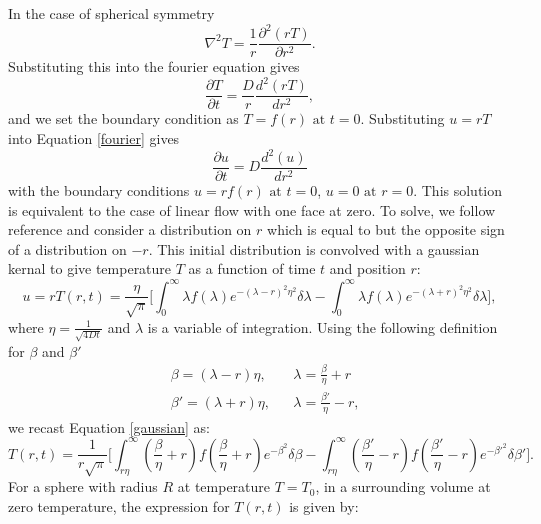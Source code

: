 

In the case of spherical symmetry
\begin{equation}
\nabla^2T = \frac{1}{r}\frac{\partial^2(rT)}{\partial r^2}.
\end{equation}
Substituting this into the fourier equation gives
\begin{equation} \label{fourier}
\frac{\partial T}{\partial t} = \frac{D}{r}\frac{d^2(rT)}{d r^2},
\end{equation} 
and we set the boundary condition as  $T = f(r) \text{ at } t=0$.
Substituting $u = rT$ into Equation \ref{fourier} gives
\begin{equation}
\frac{\partial u}{\partial t} = D\frac{d^2(u)}{dr^2}
\end{equation}
with the boundary conditions $u = rf(r) \text{ at } t=0$, $u = 0 \text{ at } r=0$.
This solution is equivalent to the case of linear flow with one face at zero. To solve, we follow reference \cite{Ingersoll1948} and consider a distribution on $r$ which is equal to but the opposite sign of a distribution on $-r$. This initial distribution is convolved with a gaussian kernal to give temperature $T$ as a function of time $t$ and position $r$: 
\begin{equation} \label{gaussian}
u = rT(r,t) = \frac{\eta}{\sqrt{\pi}} \bigg[ \int_0^\infty \lambda f(\lambda) e^{-(\lambda-r)^2\eta^2}\delta \lambda - \int_0^\infty \lambda f(\lambda) e^{-(\lambda+r)^2\eta^2}\delta \lambda \bigg],
\end{equation}
where $\eta = \frac{1}{\sqrt{4Dt}}$ and $\lambda$ is a variable of integration.
Using the following definition for $\beta$ and $\beta'$
\begin{equation}
\begin{aligned}
& \beta = (\lambda-r)\eta, && \lambda = \frac{\beta}{\eta} + r \\
& \beta' = (\lambda+r)\eta, && \lambda = \frac{\beta'}{\eta} - r, 
\end{aligned}
\end{equation}
we recast Equation \ref{gaussian} as:
\begin{equation}
T(r,t) = \frac{1}{r\sqrt{\pi}} \bigg[ \int^\infty_{r \eta}  \left( \frac{\beta}{\eta} + r\right) f\left( \frac{\beta}{\eta} + r\right)e^{-\beta^2}\delta \beta - \int^\infty_{r \eta}  \left( \frac{\beta'}{\eta} - r\right) f\left( \frac{\beta'}{\eta} - r\right)e^{-\beta'^2} \delta \beta' \bigg].
\end{equation}
For a sphere with radius $R$ at temperature $T=T_0$, in a surrounding volume at zero temperature, the expression for $T(r,t)$ is given by:
